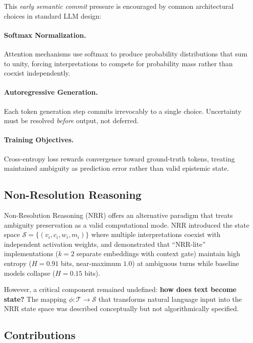 \documentclass[11pt,a4paper]{article}
\begin{document}
This \textit{early semantic commit} pressure is encouraged by common architectural
choices in standard LLM design:

\paragraph{Softmax Normalization.}
Attention mechanisms use softmax to produce probability distributions that sum to unity, 
forcing interpretations to compete for probability mass rather than coexist independently.

\paragraph{Autoregressive Generation.}
Each token generation step commits irrevocably to a single choice. Uncertainty must be 
resolved \textit{before} output, not deferred.

\paragraph{Training Objectives.}
Cross-entropy loss rewards convergence toward ground-truth tokens, treating maintained 
ambiguity as prediction error rather than valid epistemic state.

\subsection{Non-Resolution Reasoning}

Non-Resolution Reasoning (NRR) \cite{saito2025nrr} offers an alternative paradigm that 
treats ambiguity preservation as a valid computational mode. NRR introduced the state 
space $\mathcal{S} = \{(v_i, c_i, w_i, m_i)\}$ where multiple interpretations coexist with 
independent activation weights, and demonstrated that ``NRR-lite'' 
implementations ($k{=}2$ separate embeddings with context gate) maintain high entropy 
($H = 0.91$ bits, near-maximum $1.0$) at ambiguous turns while baseline 
models collapse ($H = 0.15$ bits).

However, a critical component remained undefined: \textbf{how does text become state?} 
The mapping $\phi: \mathcal{T} \to \mathcal{S}$ that transforms natural language input 
into the NRR state space was described conceptually but not algorithmically specified.

\subsection{Contributions}
\end{document}
